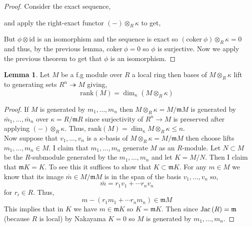 \documentclass[12pt]{extarticle}
\newcommand{\id}{\mathrm{id}}
\newcommand{\coker}[1]{\mathrm{coker}\: #1}
\theoremstyle{definition}
\newtheorem{lemma}[theorem]{Lemma}
\newcommand{\m}{\mathfrak{m}}
\newcommand{\onto}{\twoheadrightarrow}
\begin{document}
\begin{proof}
Consider the exact sequence,
\begin{center}
\end{center}
and apply the right-exact functor $(-) \otimes_R \kappa$ to get,
\begin{center}
\end{center}
But $\phi \otimes \id$ is an isomorphism and the sequence is exact so $(\coker{\phi}) \otimes_R \kappa = 0$ and thus, by the previous lemma, $\coker{\phi} = 0$ so $\phi$ is surjective. Now we apply the previous theorem to get that $\phi$ is an isomorphism.
\end{proof}

\begin{lemma}
Let $M$ be a f.g module over $R$ a local ring then bases of $M \otimes_R \kappa$ lift to generating sets $R^n \onto M$ giving,
\[ \mathrm{rank}(M) = \dim_{\kappa}{(M \otimes_R \kappa)} \]
\end{lemma}

\begin{proof}
If $M$ is generated by $m_1, \dots, m_n$ then $M \otimes_R \kappa = M / \m M$ is generated by $\bar{m}_1, \dots, \bar{m}_n$ over $\kappa = R / \m R$ since surjectivity of $R^n \to M$ is preserved after applying $(-) \otimes_R \kappa$. Thus, $\mathrm{rank}(M) = \dim_{\kappa} M \otimes_{R} \kappa \le n$. 
\bigskip\\
Now suppose that $v_1, \dots, v_n$ is a $\kappa$-basis of $M \otimes_{R} \kappa = M / \m M$ then choose lifts $m_1, \dots, m_n \in M$. I claim that $m_1, \dots, m_n$ generate $M$ as an $R$-module. Let $N \subset M$ be the $R$-submodule generated by the $m_1, \dots, m_n$ and let $K = M / N$. Then I claim that $\m K = K$. To see this it suffices to show that $K \subset \m K$. For any $m \in M$ we know that its image $\bar{m} \in M / \m M$ is in the span of the basis $v_1, \dots, v_n$ so,
\[ \bar{m} = r_1 v_1 + \cdots r_n v_n \]
for $r_i \in R$. Thus,
\[ m - (r_1 m_1 + \cdots r_n m_n) \in \m M \]
This implies that in $K$ we have $m \in \m K$ so $K = \m K$. Then since $\Jac{R} = \m$ (because $R$ is local) by Nakayama $K = 0$ so $M$ is generated by $m_1, \dots, m_n$. 
\end{proof}
\end{document}
